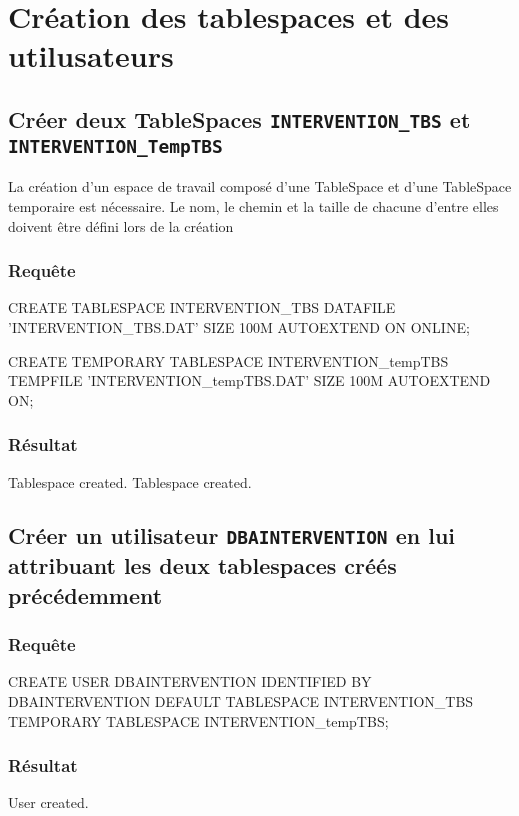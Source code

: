 \documentclass[•]{article}
\begin{document}
\def\reportnumber{1}
\def\reporttitle{Création et manipulation d'une BD}

\section{Création des tablespaces et des utilusateurs}
\subsection{Créer deux TableSpaces \texttt{INTERVENTION\_TBS} et \texttt{INTERVENTION\_TempTBS}}
\textrm{La création d'un espace de travail composé d'une TableSpace et d'une TableSpace temporaire est nécessaire. 
Le nom, le chemin et la taille de chacune d'entre elles doivent être défini lors de la création}
\subsubsection{Requête}
\begin{sql}
CREATE TABLESPACE INTERVENTION_TBS
DATAFILE 'INTERVENTION_TBS.DAT'
SIZE 100M
AUTOEXTEND ON
ONLINE;

CREATE TEMPORARY TABLESPACE INTERVENTION_tempTBS
TEMPFILE 'INTERVENTION_tempTBS.DAT'
SIZE 100M
AUTOEXTEND ON;
\end{sql}
\subsubsection{Résultat}
\begin{sql}
Tablespace created.
Tablespace created.
\end{sql}
\subsection{Créer un utilisateur \texttt{DBAINTERVENTION} en lui attribuant les deux tablespaces créés précédemment}
\subsubsection{Requête}
\begin{sql}
CREATE USER DBAINTERVENTION
IDENTIFIED BY DBAINTERVENTION
DEFAULT TABLESPACE INTERVENTION_TBS
TEMPORARY TABLESPACE INTERVENTION_tempTBS;
\end{sql}
\subsubsection{Résultat}
\begin{sql}
User created.
\end{sql}
\end{document}
